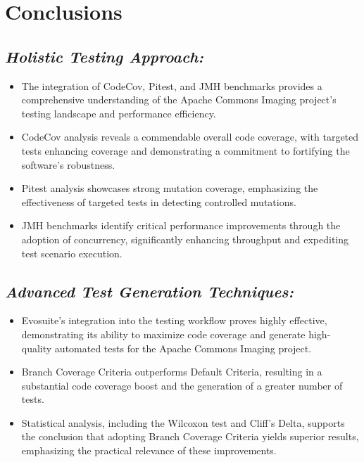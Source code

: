 \documentclass[sigconf]{acmart}
\begin{document}
\section{Conclusions}

\subsection{\textbf{\textit{Holistic Testing Approach:}}}
   \begin{itemize}
       \item The integration of CodeCov, Pitest, and JMH benchmarks provides a comprehensive understanding of the Apache Commons Imaging project's testing landscape and performance efficiency.
       \item CodeCov analysis reveals a commendable overall code coverage, with targeted tests enhancing coverage and demonstrating a commitment to fortifying the software's robustness.
       \item Pitest analysis showcases strong mutation coverage, emphasizing the effectiveness of targeted tests in detecting controlled mutations.
       \item JMH benchmarks identify critical performance improvements through the adoption of concurrency, significantly enhancing throughput and expediting test scenario execution.
   \end{itemize}

\subsection{\textbf{\textit{Advanced Test Generation Techniques:}}}
   \begin{itemize}
       \item Evosuite's integration into the testing workflow proves highly effective, demonstrating its ability to maximize code coverage and generate high-quality automated tests for the Apache Commons Imaging project.
       \item Branch Coverage Criteria outperforms Default Criteria, resulting in a substantial code coverage boost and the generation of a greater number of tests.
       \item Statistical analysis, including the Wilcoxon test and Cliff’s Delta, supports the conclusion that adopting Branch Coverage Criteria yields superior results, emphasizing the practical relevance of these improvements.
   \end{itemize}
\end{document}
